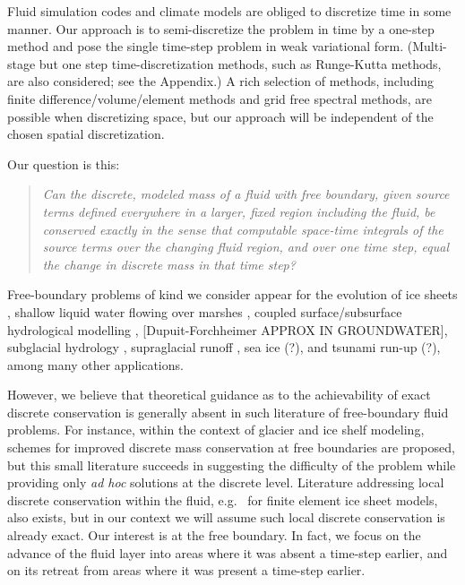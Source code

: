 \documentclass[final,leqno,onefignum,onetabnum]{siamltex1213bueler}
\begin{document}
Fluid simulation codes and climate models are obliged to discretize time in some manner.  Our approach is to semi-discretize the problem in time by a one-step method and pose the single time-step problem in weak variational form.  (Multi-stage but one step time-discretization methods, such as Runge-Kutta methods, are also considered; see the Appendix.)  A rich selection of methods, including finite difference/volume/element methods and grid free spectral methods, are possible when discretizing space, but our approach will be independent of the chosen spatial discretization.

Our question is this:
  \begin{quote}
  \emph{Can the discrete, modeled mass of a fluid with free boundary, given source terms defined everywhere in a larger, fixed region including the fluid, be conserved exactly in the sense that computable space-time integrals of the source terms over the changing fluid region, and over one time step, equal the change in discrete mass in that time step?}
  \end{quote}

Free-boundary problems of kind we consider appear for the evolution of ice sheets \cite{BLKCB,CDDSV,EgholmNielsen2010,JouvetBueler2012}, shallow liquid water flowing over marshes \cite{AlonsoSantillanaDawson}, coupled surface/subsurface hydrological modelling \cite{Maxwelletal2014}, [Dupuit-Forchheimer APPROX IN GROUNDWATER], subglacial hydrology \cite{AschwandenBuelerKhroulevBlatter,BuelervanPeltDRAFT,Schoofetal2012}, supraglacial runoff \cite{AschwandenBuelerKhroulevBlatter}, sea ice (?), and tsunami run-up (?), among many other applications.

However, we believe that theoretical guidance as to the achievability of exact discrete conservation is generally absent in such literature of free-boundary fluid problems.  For instance, within the context of glacier \cite{JaroschSchoofAnslow2013} and ice shelf \cite{Albrechtetal2011} modeling, schemes for improved discrete mass conservation at free boundaries are proposed, but this small literature succeeds in suggesting the difficulty of the problem while providing only \emph{ad hoc} solutions at the discrete level.  Literature addressing local discrete conservation within the fluid, e.g.~\cite{Lengetal2014} for finite element ice sheet models, also exists, but in our context we will assume such local discrete conservation is already exact.  Our interest is at the free boundary.  In fact, we focus on the advance of the fluid layer into areas where it was absent a time-step earlier, and on its retreat from areas where it was present a time-step earlier.
\end{document}
